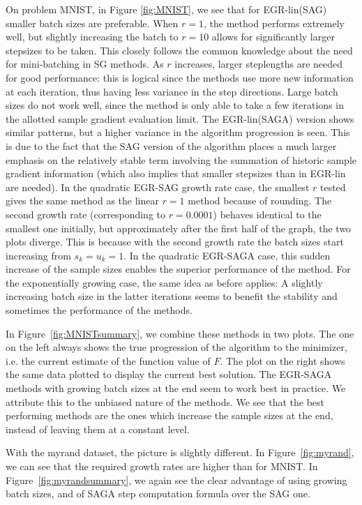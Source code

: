 \documentclass[11pt]{article}
\begin{document}
   
		 
	     On problem MNIST, in Figure \ref{fig:MNIST}, we see that for EGR-lin(SAG) smaller batch sizes are preferable. When $r=1$, the method performs extremely well, but slightly increasing the batch to $r=10$ allows for significantly larger stepsizes to be taken. This closely follows the common knowledge about the need for mini-batching in SG methods. As $r$ increases, larger steplengths are needed for good performance: this is logical since the methods use more new information at each iteration, thus having less variance in the step directions. Large batch sizes do not work well, since the method is only able to take a few iterations in the allotted sample gradient evaluation limit. The EGR-lin(SAGA) version shows similar patterns, but a higher variance in the algorithm progression is seen. This is due to the fact that the SAG version of the algorithm places a much larger emphasis on the relatively stable term involving the summation of historic sample gradient information (which also implies that smaller stepsizes than in EGR-lin are needed). In the quadratic EGR-SAG growth rate case, the smallest $r$ tested gives the same method as the linear $r=1$ method because of rounding. The second growth rate (corresponding to $r=0.0001$) behaves identical to the smallest one initially, but approximately after the first half of the graph, the two plots diverge. This is because with the second growth rate the batch sizes start increasing from $s_k=u_k=1$. In the quadratic EGR-SAGA case, this sudden increase of the sample sizes enables the superior performance of the method. For the exponentially growing case, the same idea as before applies: A slightly increasing batch size in the latter iterations seems to benefit the stability and sometimes the performance of the methods.
   
	     In Figure~\ref{fig:MNISTsummary}, we combine these methods in two plots. The one on the left always shows the true progression of the algorithm to the minimizer, i.e. the current estimate of the function value of $F$. The plot on the right shows the same data plotted to display the current best solution. The EGR-SAGA methods with growing batch sizes at the end seem to work best in practice. We attribute this to the unbiased nature of the methods. We see that the best performing methods are the ones which increase the sample sizes at the end, instead of leaving them at a constant level. 
   
	     With the myrand dataset, the picture is slightly different. In Figure~\ref{fig:myrand}, we can see that the required growth rates are higher than for MNIST. In Figure~\ref{fig:myrandsummary}, we again see the clear advantage of using growing batch sizes, and of SAGA step computation formula over the SAG one. 
   
\end{document}
